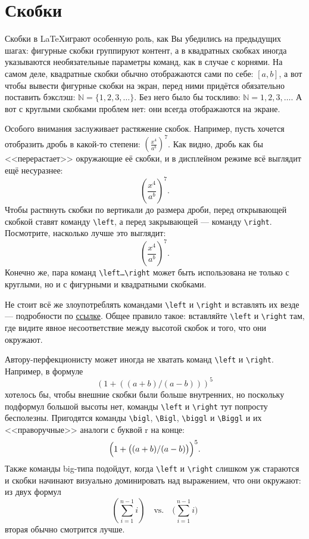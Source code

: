 \section{Скобки}
\par Скобки в \LaTeX играют особенную роль, как Вы убедились на предыдущих шагах: фигурные скобки группируют контент, а в квадратных скобках иногда указываются необязательные параметры команд, как в случае с корнями. На самом деле, квадратные скобки обычно отображаются сами по себе: \( [a,b] \), а вот чтобы вывести фигурные скобки на экран, перед ними придётся обязательно поставить бэкслэш: \( \mathbb{N} = \{1,2,3,\ldots\} \). Без него было бы тоскливо: \( \mathbb{N} = {1,2,3,\ldots} \). А вот с круглыми скобками проблем нет: они всегда отображаются на экране.
\par Особого внимания заслуживает растяжение скобок. Например, пусть хочется отобразить дробь в какой-то степени: \( (\frac{x^4}{a^b})^7 \). Как видно, дробь как бы <<перерастает>> окружающие её скобки, и в дисплейном режиме всё выглядит ещё несуразнее: \[ (\frac{x^4}{a^b})^7 .\]
Чтобы растянуть скобки по вертикали до размера дроби, перед открывающей скобкой ставят команду \verb"\left", а перед закрывающей --- команду \verb"\right". Посмотрите, насколько лучше это выглядит: \[ \left(\frac{x^4}{a^b}\right)^7 .\]
Конечно же, пара команд \verb"\left…\right" может быть использована не только с круглыми, но и с фигурными и квадратными скобками.
\par Не стоит всё же злоупотреблять командами \verb"\left" и \verb"\right" и вставлять их везде --- подробности по \href{http://tex.stackexchange.com/a/58641}{ссылке}. Общее правило такое: вставляйте \verb"\left" и \verb"\right" там, где видите явное несоответствие между высотой скобок и того, что они окружают.
\par Автору-перфекционисту может иногда не хватать команд \verb"\left" и \verb"\right". Например, в формуле \[\left( 1 + \left( \left( a+b \right)/\left(a-b\right) \right) \right)^5\] хотелось бы, чтобы внешние скобки были больше внутренних, но поскольку подформул большой высоты нет, команды \verb"\left" и \verb"\right" тут попросту бесполезны. Пригодятся команды \verb"\bigl", \verb"\Bigl", \verb"\biggl" и \verb"\Biggl"\index{\bigl,\Bigl,\biggl,\Biggl,\bigr,\Bigr,\biggr,\Biggr} и их <<праворучные>> аналоги с буквой r на конце: \[\Bigl( 1 + \bigl( (a+b)/(a-b) \bigr) \Bigr)^5.\]
Также команды big-типа подойдут, когда \verb"\left" и \verb"\right" слишком уж стараются и скобки начинают визуально доминировать над выражением, что они окружают: из двух формул
\[
\left( \sum_{i=1}^{n-1} i \right)
\quad\text{vs.}\quad
\biggl(\sum_{i=1}^{n-1} i\biggr)
\]
вторая обычно смотрится лучше.

